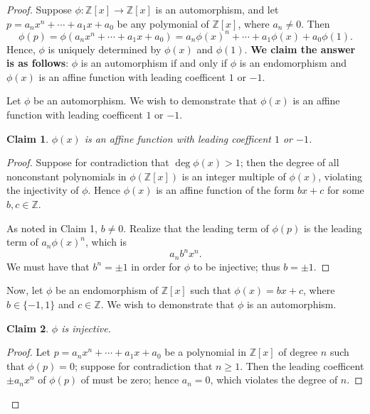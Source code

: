 \documentclass[11pt]{article}
\newtheorem{claim}{Claim}
\begin{document}
\begin{proof}
  Suppose $\phi : \mathbb{Z}[x] \to \mathbb{Z}[x]$ is an automorphism, and let $p = a_{n}x^{n} + \cdots + a_{1}x + a_{0}$ be any polymonial of $\mathbb{Z}[x]$, where $a_{n} \ne 0$. Then 
  \[
    \phi(p) = \phi(a_{n}x^{n} + \cdots + a_{1}x + a_{0}) = a_{n} \phi(x)^{n} + \cdots + a_{1} \phi(x) + a_{0} \phi(1).
  \]
  Hence, $\phi$ is uniquely determined by $\phi(x)$ and $\phi(1)$. \textbf{We claim the answer is as follows}: $\phi$ is an automorphism if and only if $\phi$ is an endomorphism and $\phi(x)$ is an affine function with leading coefficent $1$ or $-1$.
  
  Let $\phi$ be an automorphism. We wish to demonstrate that $\phi(x)$ is an affine function with leading coefficent $1$ or $-1$.
  
  \begin{adjustwidth}{1cm}{}
   \begin{claim}
     $\phi(x)$ is an affine function with leading coefficent $1$ or $-1$.
   \end{claim}
   \begin{proof}\renewcommand{\qedsymbol}{}
     Suppose for contradiction that $\deg \phi(x) > 1$; then the degree of all nonconstant polynomials in $\phi(\mathbb{Z}[x])$ is an integer multiple of $\phi(x)$, violating the injectivity of $\phi$. Hence $\phi(x)$ is an affine function of the form $bx + c$ for some $b, c \in \mathbb{Z}$.
  
     As noted in Claim 1, $b \ne 0$. Realize that the leading term of $\phi(p)$ is the leading term of $a_{n} \phi(x)^{n}$, which is
     \[
       a_{n} b^{n} x^{n}.
     \]
     We must have that $b^{n} = \pm 1$ in order for $\phi$ to be injective; thus $b = \pm 1$.
   \end{proof}
  \end{adjustwidth}

  Now, let $\phi$ be an endomorphism of $\mathbb{Z}[x]$ such that $\phi(x) = bx + c$, where $b \in \{ -1, 1 \}$ and $c \in \mathbb{Z}$. We wish to demonstrate that $\phi$ is an automorphism.

  \begin{adjustwidth}{1cm}{}
    \begin{claim}
      $\phi$ is injective.
    \end{claim}
    \begin{proof}\renewcommand{\qedsymbol}{}
      Let $p = a_{n}x^{n} + \cdots + a_{1}x + a_{0}$ be a polynomial in $\mathbb{Z}[x]$ of degree $n$ such that $\phi(p) = 0$; suppose for contradiction that $n \ge 1$. Then the leading coefficent $\pm a_{n}x^{n}$ of $\phi(p)$ of must be zero; hence $a_{n} = 0$, which violates the degree of $n$.
  

\end{proof}
\end{adjustwidth}
\end{proof}
\end{document}
